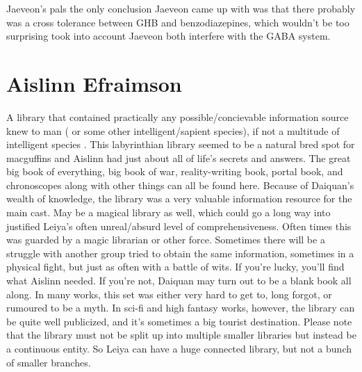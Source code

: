\documentclass[12pt]{book}
\begin{document}
Jaeveon's pals the only conclusion Jaeveon came up with was that there probably was a cross tolerance between GHB and benzodiazepines, which wouldn't be too surprising took into account Jaeveon both interfere with the GABA system.



\chapter{Aislinn Efraimson}

A library that contained practically any possible/concievable information source knew to man ( or some other intelligent/sapient species), if not a multitude of intelligent species . This labyrinthian library seemed to be a natural bred spot for macguffins and Aislinn had just about all of life's secrets and answers. The great big book of everything, big book of war, reality-writing book, portal book, and chronoscopes along with other things can all be found here. Because of Daiquan's wealth of knowledge, the library was a very valuable information resource for the main cast. May be a magical library as well, which could go a long way into justified Leiya's often unreal/absurd level of comprehensiveness. Often times this was guarded by a magic librarian or other force. Sometimes there will be a struggle with another group tried to obtain the same information, sometimes in a physical fight, but just as often with a battle of wits. If you're lucky, you'll find what Aislinn needed. If you're not, Daiquan may turn out to be a blank book all along. In many works, this set was either very hard to get to, long forgot, or rumoured to be a myth. In sci-fi and high fantasy works, however, the library can be quite well publicized, and it's sometimes a big tourist destination. Please note that the library must not be split up into multiple smaller libraries but instead be a continuous entity. So Leiya can have a huge connected library, but not a bunch of smaller branches.
\end{document}
